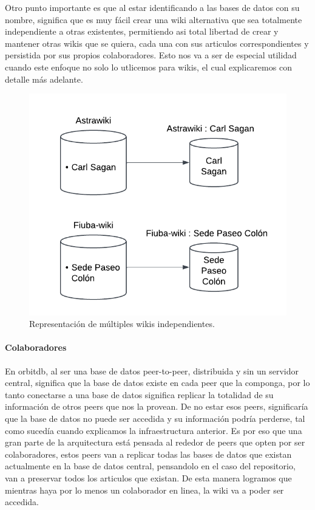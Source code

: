 Otro punto importante es que al estar identificando a las bases de datos con su nombre, significa que es muy fácil crear una wiki alternativa que sea totalmente independiente a otras existentes, permitiendo asi total libertad de crear y mantener otras wikis que se quiera, cada una con sus articulos correspondientes y persistida por sus propios colaboradores. Esto nos va a ser de especial utilidad cuando este enfoque no solo lo utlicemos para wikis, el cual explicaremos con detalle más adelante.

\begin{figure}[H]
    \centering
    \includegraphics[width=0.6\linewidth]{img/solucion-ipfs/bdd-multiple.png}
    \caption{Representación de múltiples wikis independientes.}
    \label{fig:bdd-multiple}
\end{figure}

\paragraph{Colaboradores}

En orbitdb, al ser una base de datos peer-to-peer, distribuida y sin un servidor central, significa que la base de datos existe en cada peer que la componga, por lo tanto conectarse a una base de datos significa replicar la totalidad de su información de otros peers que nos la provean. De no estar esos peers, significaría que la base de datos no puede ser accedida y su información podría perderse, tal como sucedía cuando explicamos la infraestructura anterior. Es por eso que una gran parte de la arquitectura está pensada al rededor de peers que opten por ser colaboradores, estos peers van a replicar todas las bases de datos que existan actualmente en la base de datos central, pensandolo en el caso del repositorio, van a preservar todos los articulos que existan. De esta manera logramos que mientras haya por lo menos un colaborador en linea, la wiki va a poder ser accedida.

